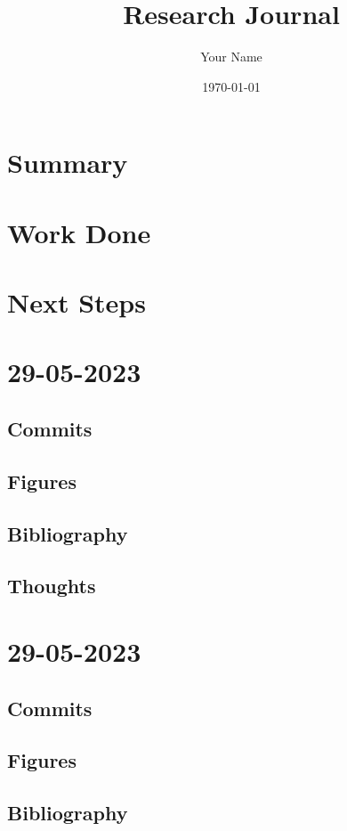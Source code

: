 \documentclass{article}
\begin{document}
\title{Research Journal}
\author{Your Name}
\date{\today}

\maketitle

\section{Summary}

\section{Work Done}

\section{Next Steps}


\section{29-05-2023}
\subsection{Commits}
\subsection{Figures}
\subsection{Bibliography}
\subsection{Thoughts}


\section{29-05-2023}
\subsection{Commits}
\subsection{Figures}
\subsection{Bibliography}
\end{document}

